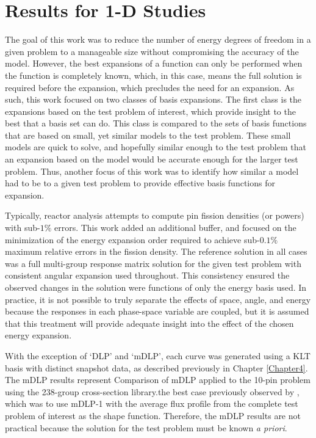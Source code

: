 
\chapter{Results for 1-D Studies} %

\label{Chapter5}


The goal of this work was to reduce the number of energy degrees of freedom in 
a given problem to a manageable size without compromising the accuracy of the 
model.  
However, the best expansions of a function can only be performed when the 
function is completely
known, which, in this case, means the full solution is required before the 
expansion, which precludes the need for an expansion.  As such, 
this work focused on two classes of basis expansions.  The first class is the 
expansions based on the test problem of interest, which provide insight to the 
best that a basis set can do.  This class is compared to the sets of basis 
functions that are based on small, yet similar models to the test problem.  
These small models are quick to solve, and hopefully similar enough to the 
test problem that an expansion based on the model would be accurate enough for 
the larger test problem.  Thus, another focus of this work was to identify how 
similar a model had to be to a given test problem to provide effective basis 
functions for expansion.

Typically, reactor analysis attempts to compute pin fission densities (or 
powers) with sub-$1\%$ errors.  This work added an additional buffer, and 
focused on the minimization of the energy expansion order 
required to 
achieve sub-$0.1\%$ maximum relative errors in the fission density. The 
reference solution in all cases was a full multi-group response matrix solution 
for the given test problem with consistent angular expansion used throughout.  
This consistency ensured the observed changes in the solution were functions of only the 
energy basis used.  In practice, it is 
not possible to truly separate the effects of space, angle, and energy because 
the responses in each phase-space variable are coupled, but it is assumed that 
this treatment will provide adequate insight into the effect of the chosen 
energy expansion.

With the exception of `DLP' and `mDLP', each curve was generated using a KLT 
basis with distinct snapshot data, as described previously in Chapter 
\ref{Chapter4}. 
The mDLP results represent Comparison of mDLP applied to the 10-pin problem using the 
            238-group cross-section library.the best case previously observed by 
\citet{Roberts2014}, which was to use mDLP-1 with the average flux profile from 
the complete test problem of interest as the shape function.  Therefore, the 
mDLP 
results are not practical because the solution for the test problem must be 
known {\it a priori}.  

